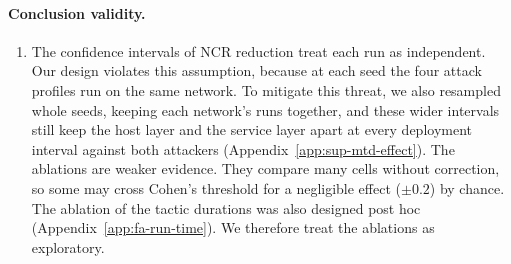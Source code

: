 \documentclass{cshonours}
\begin{document}
\paragraph{Conclusion validity.}
\begin{enumerate}[resume*=threats]
\item\label{thr:statistics}\label{thr:posthoc} The confidence intervals of
NCR reduction treat each run as independent. Our design violates this
assumption, because at each seed the four attack profiles run on the same
network. To mitigate this threat, we also resampled whole seeds, keeping each
network's runs together, and these wider intervals still keep the host layer
and the service layer apart at every deployment interval against both
attackers (Appendix~\ref{app:sup-mtd-effect}). The ablations are weaker
evidence. They compare many cells without correction, so some may cross
Cohen's threshold for a negligible effect ($\pm 0.2$) by chance. The ablation
of the tactic durations was also designed post hoc
(Appendix~\ref{app:fa-run-time}). We therefore treat the ablations as
exploratory.
\end{enumerate}
\end{document}
